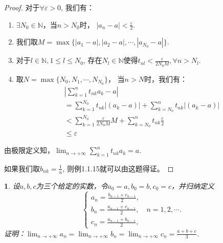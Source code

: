 \documentclass[utf8]{book}
\newtheorem{example}{}[section]             %
\begin{document}
\begin{proof}
对于$\forall \varepsilon > 0$, 我们有：
\begin{enumerate}
\renewcommand\labelenumi{\normalfont(\theenumi)}
\item $\exists N_0\in \mathbb{N}$，当$n > N_0$时， $\left| a_n - a\right| < \frac{\varepsilon}{2}$.
\item 我们取$M = \max\{|a_1 - a|, |a_2 - a|, \cdots, |a_{N_0} - a|\}$.
\item 对于$l\in\mathbb{N}, 1 \leq l \leq N_{0}$, 存在$N_l \in \mathbb{N}$使得$t_{nl} < \frac{\varepsilon}{2N_0M}, \forall n > N_l$.
\item 取$N = \max \{N_0, N_1, \cdots, N_{N_0}\}$， 当$n > N$时，我们有：
\begin{equation*}
\begin{split}
&\left | \displaystyle \sum_{k=1}^nt_{nk}a_k - a \right | \\
&= \displaystyle \sum_{k=1}^{N_0}t_{nk}\left |(a_k-a)\right| + \displaystyle \sum_{k=N_{0}}^{n}t_{nk}\left |(a_k-a)\right|\\
&< \displaystyle \sum_{k=1}^{N_0}\frac{\varepsilon}{2N_0M}M + \displaystyle \sum_{k=N_{0}}^{n}t_{nk}\frac{\varepsilon}{2}\\
&\leq\varepsilon
\end{split}
\end{equation*}
\end{enumerate}
由极限定义知，$\displaystyle \lim_{n\to +\infty}\sum_{k=1}^nt_{nk}a_k = a$.

如果我们取$b_{nk} = \frac{1}{n}$, 则例1.1.15就可以由这题得证。
\end{proof}
\begin{example}
设$a,b,c$为三个给定的实数，令$a_0=a,b_0=b,c_0=c$，并归纳定义
\begin{equation*}
\begin{cases}
a_n = \displaystyle\frac{b_{n-1}+c_{n-1}}{2},\\
b_n = \displaystyle\frac{a_{n-1}+c_{n-1}}{2}, \quad n=1,2,\cdots.\\
c_n = \displaystyle\frac{a_{n-1}+b_{n-1}}{2},
\end{cases}
\end{equation*}
证明：$\displaystyle \lim_{n\to +\infty}a_n = \lim_{n\to +\infty}b_n=\lim_{n\to +\infty}c_n = \frac{a+b+c}{3}$.
\end{example}
\end{document}
